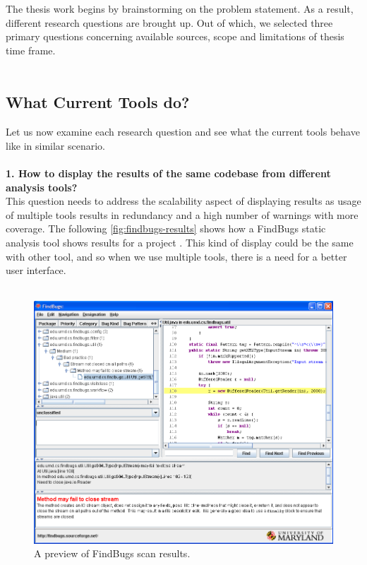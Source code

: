 The thesis work begins by brainstorming on the problem statement. As a result, different research questions are brought up. Out of which, we selected three primary questions concerning available sources, scope and limitations of thesis time frame. \\ \\


\subsection{What Current Tools do?}

Let us now examine each research question and see what the current tools behave like in similar scenario. \\ \\

\textbf{1. How to display the results of the same codebase from different analysis tools?} \\

This question needs to address the scalability aspect of displaying results as usage of multiple tools results in redundancy and a high number of warnings with more coverage. The following \autoref{fig:findbugs-results} shows how a FindBugs \cite{findbugs} static analysis tool shows results for a project \cite{findbugs-example}. This kind of display could be the same with other tool, and so when we use multiple tools, there is a need for a better user interface. \\ \\

\begin{figure}[hbt!]
	\centering
	\includegraphics[width=\linewidth]{figures/findbugs-results}
	\caption{A preview of FindBugs scan results.}
	\label{fig:findbugs-results}
\end{figure}


